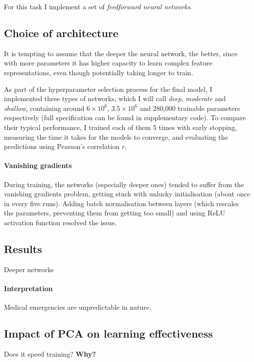 \documentclass[10pt, twocolumn]{article}
\begin{document}
For this task I implement a set of \textit{feedforward neural networks}.

\subsection{Choice of architecture}
It is tempting to assume that the deeper the neural network, the better, since with more parameters it has higher capacity to learn complex feature representations, even though potentially taking longer to train. 

As part of the hyperparameter selection process for the final model, I implemented three types of networks, which I will call \textit{deep}, \textit{moderate} and \textit{shallow}, containing around $6\times 10^6$, $3.5\times 10^6$ and 280,000 trainable parameters respectively (full specification can be found in supplementary code). To compare their typical performance, I trained each of them 5 times with early stopping, measuring the time it takes for the models to converge, and evaluating the predictions using Pearson's correlation $r$.

\paragraph{Vanishing gradients} During training, the networks (especially deeper ones) tended to suffer from the vanishing gradients problem, getting stuck with unlucky initialisation (about once in every five runs). Adding batch normalisation between layers (which rescales the parameters, preventing them from getting too small) and using ReLU activation function resolved the issue.

\subsection{Results}


Deeper networks 


\paragraph{Interpretation}
Medical emergencies are unpredictable in nature. 


\subsection{Impact of PCA on learning effectiveness}

Does it speed training? \textbf{Why?}
\end{document}
